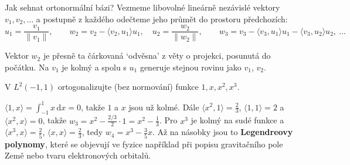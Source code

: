 Jak sehnat ortonormální bázi? Vezmeme libovolné lineárně nezávislé vektory $v_1, v_2, \dots$ a postupně z každého odečteme jeho průmět do prostoru předchozích:
\begin{equation*}
  u_1 = \frac{v_1}{\|v_1\|},\qquad w_2 = v_2 - \langle v_2, u_1\rangle u_1,\quad u_2 = \frac{w_2}{\|w_2\|},\qquad w_3 = v_3 - \langle v_3, u_1\rangle u_1 - \langle v_3, u_2\rangle u_2,\ \dots
\end{equation*}

\begin{center}
\end{center}

Vektor $w_2$ je přesně ta čárkovaná `odvěsna' z věty o projekci, posunutá do počátku. Na $v_1$ je kolmý a spolu s $u_1$ generuje stejnou rovinu jako $v_1$, $v_2$.

\begin{problem}
  V $L^2(-1, 1)$ ortogonalizujte (bez normování) funkce $1, x, x^2, x^3$.
\end{problem}

\begin{solution}
  $\langle 1, x\rangle = \int_{-1}^1 x\,\mathrm{d}x = 0$, takže $1$ a $x$ jsou už kolmé. Dále $\langle x^2, 1\rangle = \frac{2}{3}$, $\langle 1, 1\rangle = 2$ a $\langle x^2, x\rangle = 0$, takže $w_3 = x^2 - \frac{2/3}{2}\cdot 1 = x^2 - \frac{1}{3}$. Pro $x^3$ je kolmý na sudé funkce a $\langle x^3, x\rangle = \frac{2}{5}$, $\langle x, x\rangle = \frac{2}{3}$, tedy $w_4 = x^3 - \frac{3}{5}x$. Až na násobky jsou to \textbf{Legendreovy polynomy}, které se objevují ve fyzice například při popisu gravitačního pole Země nebo tvaru elektronových orbitalů.
\end{solution}

